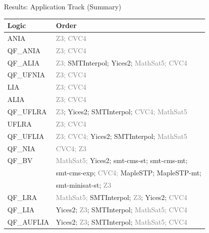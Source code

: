 \documentclass{beamer}
\begin{document}

\begin{frame}{Results: Application Track (Summary)}
  \begin{tabular}{ll}
    Logic       & Order \\ \hline
    ANIA	& \textcolor{gray}{Z3; CVC4} \\
    QF\_ANIA	& \textcolor{gray}{Z3; CVC4} \\
    QF\_ALIA	& \textcolor{gray}{Z3;} SMTInterpol; Yices2; \textcolor{gray}{MathSat5; CVC4} \\
    QF\_UFNIA	& \textcolor{gray}{Z3; CVC4} \\
    LIA         & \textcolor{gray}{Z3; CVC4} \\
    ALIA	& \textcolor{gray}{Z3; CVC4} \\
    QF\_UFLRA	& \textcolor{gray}{Z3}; Yices2; SMTInterpol; \textcolor{gray}{CVC4; MathSat5} \\
    UFLRA	& \textcolor{gray}{Z3; CVC4} \\
    QF\_UFLIA	& \textcolor{gray}{Z3; CVC4;} Yices2; SMTInterpol; \textcolor{gray}{MathSat5} \\
    QF\_NIA	& \textcolor{gray}{CVC4; Z3} \\
    QF\_BV	& \textcolor{gray}{MathSat5;} Yices2; smt-cms-st; smt-cms-mt; \\
    & \quad smt-cms-exp; \textcolor{gray}{CVC4;} MapleSTP; MapleSTP-mt; \\
    & \quad smt-minisat-st; \textcolor{gray}{Z3} \\
    QF\_LRA	& \textcolor{gray}{MathSat5;} SMTInterpol; \textcolor{gray}{Z3}; Yices2; \textcolor{gray}{CVC4} \\
    QF\_LIA	& Yices2; \textcolor{gray}{Z3}; SMTInterpol; \textcolor{gray}{MathSat5; CVC4} \\
    QF\_AUFLIA	& Yices2; \textcolor{gray}{Z3}; SMTInterpol; \textcolor{gray}{MathSat5; CVC4}
  \end{tabular}
\end{frame}

\end{document}
